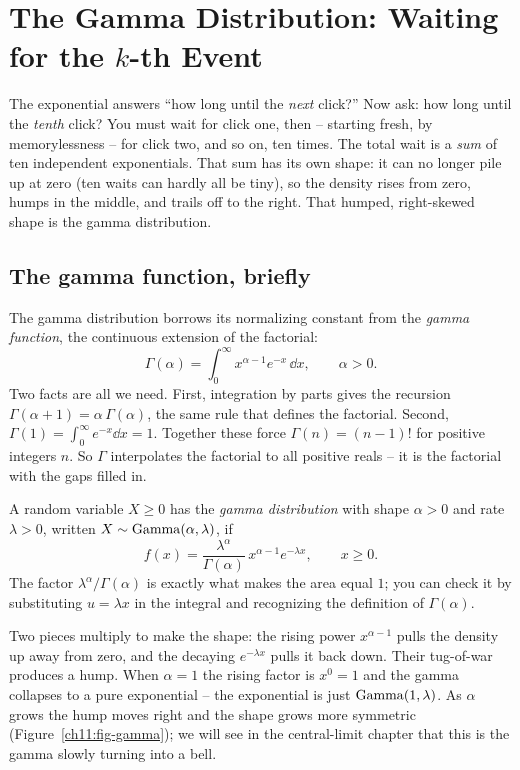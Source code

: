 \section{The Gamma Distribution: Waiting for the $k$-th Event}
\label{ch11:gamma}

\begin{intuitionbox}
The exponential answers ``how long until the \emph{next} click?'' Now ask: how
long until the \emph{tenth} click? You must wait for click one, then -- starting
fresh, by memorylessness -- for click two, and so on, ten times. The total wait
is a \emph{sum} of ten independent exponentials. That sum has its own shape: it
can no longer pile up at zero (ten waits can hardly all be tiny), so the density
rises from zero, humps in the middle, and trails off to the right. That humped,
right-skewed shape is the gamma distribution.
\end{intuitionbox}

\subsection{The gamma function, briefly}

The gamma distribution borrows its normalizing constant from the \emph{gamma
function}, the continuous extension of the factorial:
\[
  \Gamma(\alpha) = \int_0^\infty x^{\alpha-1} e^{-x}\,\dd x, \qquad \alpha > 0.
\]
Two facts are all we need. First, integration by parts gives the recursion
$\Gamma(\alpha+1) = \alpha\,\Gamma(\alpha)$, the same rule that defines the
factorial. Second, $\Gamma(1) = \int_0^\infty e^{-x}\dd x = 1$. Together these
force $\Gamma(n) = (n-1)!$ for positive integers $n$. So $\Gamma$ interpolates
the factorial to all positive reals -- it is the factorial with the gaps filled
in.

\begin{definition}
\label{ch11:def-gamma}
A random variable $X \ge 0$ has the \emph{gamma distribution} with shape
$\alpha > 0$ and rate $\lambda > 0$, written $X\sim\operatorname{Gamma}(\alpha,\lambda)$, if
\[
  f(x) = \frac{\lambda^{\alpha}}{\Gamma(\alpha)}\,x^{\alpha-1} e^{-\lambda x},
  \qquad x \ge 0.
\]
The factor $\lambda^{\alpha}/\Gamma(\alpha)$ is exactly what makes the area
equal $1$; you can check it by substituting $u = \lambda x$ in the integral and
recognizing the definition of $\Gamma(\alpha)$.
\end{definition}

Two pieces multiply to make the shape: the rising power $x^{\alpha-1}$ pulls the
density up away from zero, and the decaying $e^{-\lambda x}$ pulls it back down.
Their tug-of-war produces a hump. When $\alpha = 1$ the rising factor is
$x^0 = 1$ and the gamma collapses to a pure exponential -- the exponential is
just $\operatorname{Gamma}(1,\lambda)$. As $\alpha$ grows the hump moves right and the shape
grows more symmetric (Figure~\ref{ch11:fig-gamma}); we will see in the
central-limit chapter that this is the gamma slowly turning into a bell.

